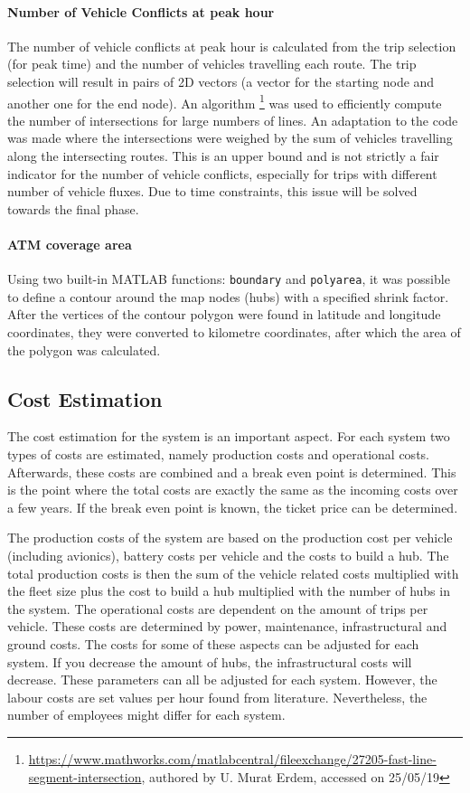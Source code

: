 \paragraph{Number of Vehicle Conflicts at peak hour}
The number of vehicle conflicts at peak hour is calculated from the trip selection (for peak time) and the number of vehicles travelling each route. The trip selection will result in pairs of 2D vectors (a vector for the starting node and another one for the end node). An algorithm \footnote{\url{https://www.mathworks.com/matlabcentral/fileexchange/27205-fast-line-segment-intersection}, authored by U. Murat Erdem, accessed on 25/05/19} was used to efficiently compute the number of intersections for large numbers of lines. An adaptation to the code was made where the intersections were weighed by the sum of vehicles travelling along the intersecting routes. This is an upper bound and is not strictly a fair indicator for the number of vehicle conflicts, especially for trips with different number of vehicle fluxes. Due to time constraints, this issue will be solved towards the final phase.

\paragraph{ATM coverage area}

Using two built-in MATLAB functions: \texttt{boundary} and \texttt{polyarea}, it was possible to define a contour around the map nodes (hubs) with a specified shrink factor. After the vertices of the contour polygon were found in latitude and longitude coordinates, they were converted to kilometre coordinates, after which the area of the polygon was calculated.


\subsection{Cost Estimation}
The cost estimation for the system is an important aspect. For each system two types of costs are estimated, namely production costs and operational costs. Afterwards, these costs are combined and a break even point is determined. This is the point where the total costs are exactly the same as the incoming costs over a few years. If the break even point is known, the ticket price can be determined. 

The production costs of the system are based on the production cost per vehicle (including avionics), battery costs per vehicle and the costs to build a hub. The total production costs is then the sum of the vehicle related costs multiplied with the fleet size plus the cost to build a hub multiplied with the number of hubs in the system. The operational costs are dependent on the amount of trips per vehicle. These costs are determined by power, maintenance, infrastructural and ground costs. The costs for some of these aspects can be adjusted for each system. If you decrease the amount of hubs, the infrastructural costs will decrease. These parameters can all be adjusted for each system. However, the labour costs are set values per hour found from literature. Nevertheless, the number of employees might differ for each system. 

